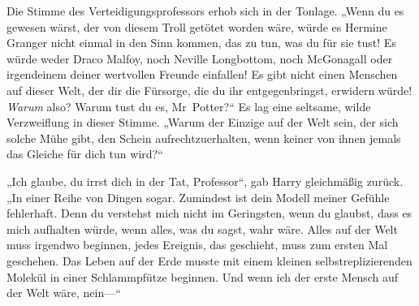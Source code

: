 Die Stimme des Verteidigungsprofessors erhob sich in der Tonlage. „Wenn du es gewesen wärst, der von diesem Troll getötet worden wäre, würde es Hermine Granger nicht einmal in den Sinn kommen, das zu tun, was du für sie tust! Es würde weder Draco Malfoy, noch Neville Longbottom, noch McGonagall oder irgendeinem deiner wertvollen Freunde einfallen! Es gibt nicht einen Menschen auf dieser Welt, der dir die Fürsorge, die du ihr entgegenbringst, erwidern würde! \emph{Warum} also? Warum tust du es, Mr~Potter?“
Es lag eine seltsame, wilde Verzweiflung in dieser Stimme.
„Warum der Einzige auf der Welt sein, der sich solche Mühe gibt, den Schein aufrechtzuerhalten, wenn keiner von ihnen jemals das Gleiche für dich tun wird?“

„Ich glaube, du irrst dich in der Tat, Professor“, gab Harry gleichmäßig zurück. „In einer Reihe von Dingen sogar. Zumindest ist dein Modell meiner Gefühle fehlerhaft. Denn du verstehst mich nicht im Geringsten, wenn du glaubst, dass es mich aufhalten würde, wenn alles, was du sagst, wahr wäre. Alles auf der Welt muss irgendwo beginnen, jedes Ereignis, das geschieht, muss zum ersten Mal geschehen. Das Leben auf der Erde musste mit einem kleinen selbstreplizierenden Molekül in einer Schlammpfütze beginnen. Und wenn ich der erste Mensch auf der Welt wäre, nein—“


